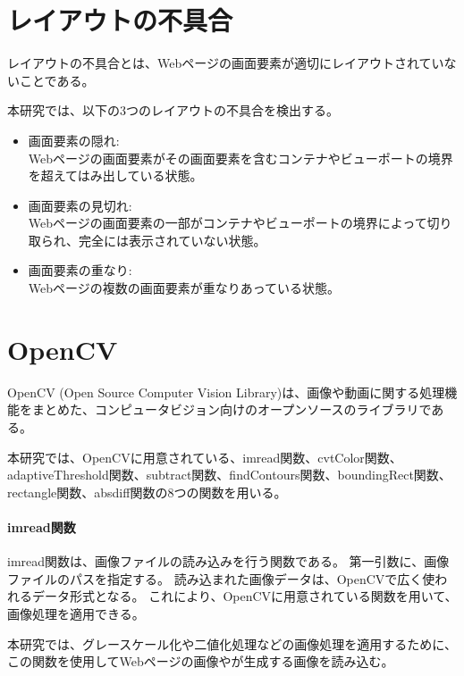 \section{レイアウトの不具合}\label{sec:layout effect}
レイアウトの不具合とは、Webページの画面要素が適切にレイアウトされていないことである\cite{LayoutFailureDetection}。
\par
本研究では、以下の3つのレイアウトの不具合を検出する。
\begin{itemize}
      \setlength{\itemsep}{0pt}
            \setlength{\parsep}{0pt}
      \item 画面要素の隠れ:\\
            Webページの画面要素がその画面要素を含むコンテナやビューポートの境界を超えてはみ出している状態。
      \item 画面要素の見切れ:\\
            Webページの画面要素の一部がコンテナやビューポートの境界によって切り取られ、完全には表示されていない状態。
      \item 画面要素の重なり:\\
            Webページの複数の画面要素が重なりあっている状態。
\end{itemize}
\section{OpenCV}\label{sec:opencv}
OpenCV (Open Source Computer Vision Library)\cite{OpenCV}は、画像や動画に関する処理機能をまとめた、コンピュータビジョン向けのオープンソースのライブラリである。
\par
本研究では、OpenCVに用意されている、imread関数、cvtColor関数、adaptiveThreshold関数、subtract関数、findContours関数、boundingRect関数、rectangle関数、absdiff関数の8つの関数を用いる。

\paragraph{imread関数}
imread関数は、画像ファイルの読み込みを行う関数である。
第一引数に、画像ファイルのパスを指定する。
読み込まれた画像データは、OpenCVで広く使われるデータ形式となる。
これにより、OpenCVに用意されている関数を用いて、画像処理を適用できる。
\par
本研究では、グレースケール化や二値化処理などの画像処理を適用するために、
この関数を使用してWebページの画像や\toolName が生成する画像を読み込む。
